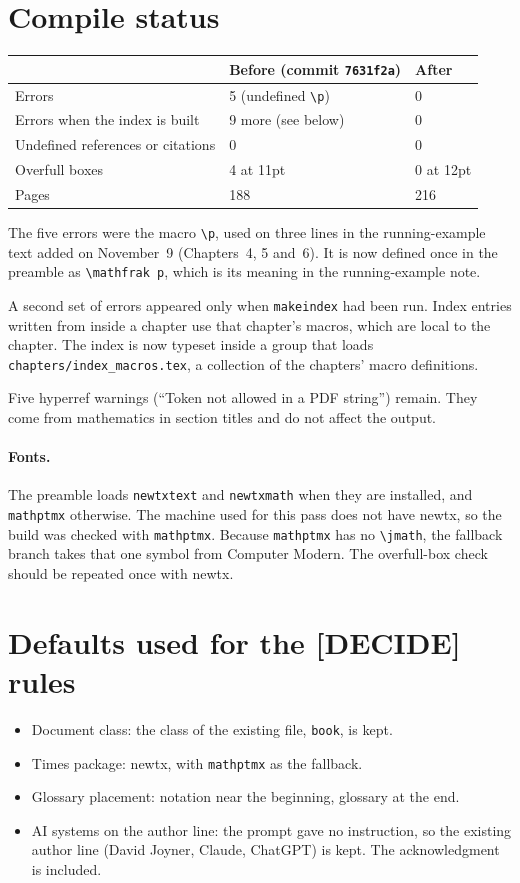 \documentclass[12pt,letterpaper]{article}
\begin{document}
\section{Compile status}\label{sec:compile}
\begin{center}
\begin{tabular}{@{}lll@{}}\toprule
 & Before (commit \texttt{7631f2a}) & After\\\midrule
Errors & 5 (undefined \verb|\p|) & 0\\
Errors when the index is built & 9 more (see below) & 0\\
Undefined references or citations & 0 & 0\\
Overfull boxes & 4 at 11pt & 0 at 12pt\\
Pages & 188 & 216\\
\bottomrule\end{tabular}
\end{center}
The five errors were the macro \verb|\p|, used on three lines in the running-example text added on November~9 (Chapters~4, 5 and~6). It is now defined once in the preamble as \verb|\mathfrak p|, which is its meaning in the running-example note.

A second set of errors appeared only when \texttt{makeindex} had been run. Index entries written from inside a chapter use that chapter's macros, which are local to the chapter. The index is now typeset inside a group that loads \texttt{chapters/index\_macros.tex}, a collection of the chapters' macro definitions.

Five hyperref warnings (``Token not allowed in a PDF string'') remain. They come from mathematics in section titles and do not affect the output.

\paragraph{Fonts.} The preamble loads \texttt{newtxtext} and \texttt{newtxmath} when they are installed, and \texttt{mathptmx} otherwise. The machine used for this pass does not have newtx, so the build was checked with \texttt{mathptmx}. Because \texttt{mathptmx} has no \verb|\jmath|, the fallback branch takes that one symbol from Computer Modern. The overfull-box check should be repeated once with newtx.

\section{Defaults used for the [DECIDE] rules}
\begin{itemize}[leftmargin=*]
\item Document class: the class of the existing file, \texttt{book}, is kept.
\item Times package: newtx, with \texttt{mathptmx} as the fallback.
\item Glossary placement: notation near the beginning, glossary at the end.
\item AI systems on the author line: the prompt gave no instruction, so the existing author line (David Joyner, Claude, ChatGPT) is kept. The acknowledgment is included.
\end{itemize}
\end{document}
